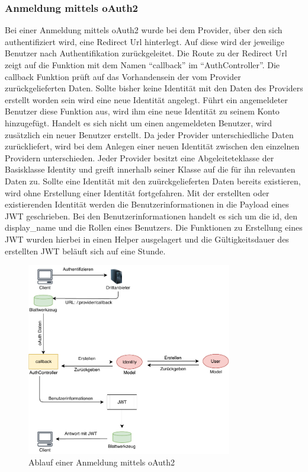 \subsubsection{Anmeldung mittels \gls{oAuth2}}
\label{sec:sever-sign-in-oauth2}
Bei einer Anmeldung mittels \gls{oAuth2} wurde bei dem Provider, über den sich authentifiziert wird, eine Redirect Url hinterlegt. Auf diese wird der jeweilige Benutzer nach Authentifikation zurückgeleitet. Die Route zu der Redirect Url zeigt auf die Funktion mit dem Namen \enquote{callback} im \enquote{AuthController}. Die callback Funktion prüft auf das Vorhandensein der vom Provider zurückgelieferten Daten. Sollte bisher keine Identität mit den Daten des Providers erstellt worden sein wird eine neue Identität angelegt. Führt ein angemeldeter Benutzer diese Funktion aus, wird ihm eine neue Identität zu seinem Konto hinzugefügt. Handelt es sich nicht um einen angemeldeten Benutzer, wird zusätzlich ein neuer Benutzer erstellt. Da jeder Provider unterschiedliche Daten zurückliefert, wird bei dem Anlegen einer neuen Identität zwischen den einzelnen Providern unterschieden. Jeder Provider besitzt eine Abgeleiteteklasse der Basisklasse Identity und greift innerhalb seiner Klasse auf die für ihn relevanten Daten zu. Sollte eine Identität mit den zuürckgelieferten Daten bereits existieren, wird ohne Erstellung einer Identität fortgefahren. Mit der erstellten oder existierenden Identität werden die Benutzerinformationen in die Payload eines \gls{JWT} geschrieben. Bei den Benutzerinformationen handelt es sich um die id, den display\_name und die Rollen eines Benutzers. Die Funktionen zu Erstellung eines \gls{JWT} wurden hierbei in einen Helper ausgelagert und die Gültigkeitsdauer des erstellten \gls{JWT} beläuft sich auf eine Stunde.

\begin{figure}[h]
	\centering
	\includegraphics[width=0.8\textwidth]{graphics/sign-in-oauth2.pdf}
	\caption{Ablauf einer Anmeldung mittels \gls{oAuth2}}
	\label{fig:server-sign-in-oauth}
\end{figure}

